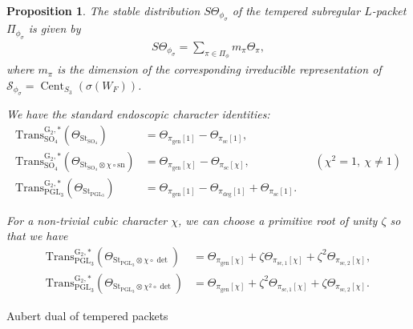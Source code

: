 \documentclass[12pt]{amsart}
\makeatletter
\renewcommand{\subsection}{\@startsection{subsection}{2}%
  \z@{.7\linespacing\@plus.5\linespacing}{.35\linespacing}%
  {\normalfont\bfseries\raggedright}}
\theoremstyle{definition}
\theoremstyle{plain}
\newtheorem{proposition}[definition]{Proposition}
\theoremstyle{remark}
\def\PGL{\mathrm{PGL}}
\def\SO{\mathrm{SO}}
\DeclareMathOperator{\Cent}{Cent}%
\newcommand{\cS}{\mathcal{S}}
\numberwithin{equation}{section}
\newcommand{\gen}{\mathrm{gen}}
\newcommand{\rG}{\mathrm{G}}
\newcommand{\Trans}{\mathrm{Trans}}
\newcommand{\St}{\mathrm{St}}
\newcommand{\sn}{\mathrm{sn}}
\makeatother
\begin{document}
\begin{proposition}\label{prop:tempered-subregular}
      The stable distribution $S\Theta_{\phi_{\sigma}}$ of the tempered subregular $L$-packet $\Pi_{\phi_{\sigma}}$ is given by
      \begin{align*}
            S\Theta_{\phi_{\sigma}} = \sum_{\pi \in \Pi_{\phi}} m_{\pi} \Theta_{\pi},
      \end{align*}
      where $m_{\pi}$ is the dimension of the corresponding irreducible representation of $\cS_{\phi_{\sigma}} = \Cent_{S_3}(\sigma(W_F))$.

      We have the standard endoscopic character identities:
      \begin{align*}
            \Trans^{\rG_2, *}_{\SO_4}(\Theta_{\St_{\SO_4}}) &= \Theta_{\pi_{\gen}[1]} - \Theta_{\pi_{\mathrm{sc}}[1]}, \\
            \Trans^{\rG_2, *}_{\SO_4}(\Theta_{\St_{\SO_4} \otimes \chi \circ \sn}) &= \Theta_{\pi_{\gen}[\chi]} - \Theta_{\pi_{\mathrm{sc}}[\chi]}, &&(\chi^2=1,\ \chi\ne1) \\
            \Trans^{\rG_2, *}_{\PGL_3}(\Theta_{\St_{\PGL_3}}) &= \Theta_{\pi_{\gen}[1]} - \Theta_{\pi_{\deg}[1]} + \Theta_{\pi_{\mathrm{sc}}[1]}.
      \end{align*}

      For a non-trivial cubic character $\chi$, we can choose a primitive root of unity $\zeta$ so that we have 
      \begin{align*}
            \Trans^{\rG_2, *}_{\PGL_3}(\Theta_{\St_{\PGL_3} \otimes \chi \circ \det}) &= 
            \Theta_{\pi_{\gen}[\chi]} +\zeta \Theta_{\pi_{\mathrm{sc}, 1}[\chi]} + \zeta^2 \Theta_{\pi_{\mathrm{sc}, 2}[\chi]}, \\
            \Trans^{\rG_2, *}_{\PGL_3}(\Theta_{\St_{\PGL_3} \otimes \chi^2 \circ \det}) &= \Theta_{\pi_{\gen}[\chi]} + \zeta^2 \Theta_{\pi_{\mathrm{sc}, 1}[\chi]} + \zeta \Theta_{\pi_{\mathrm{sc}, 2}[\chi]}.
      \end{align*} 
\end{proposition}

\subsection{Aubert dual of tempered packets}\label{sec:subregular-aubert}
\end{document}
